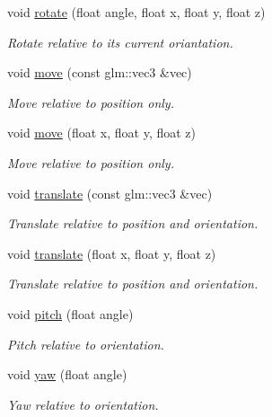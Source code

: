 \begin{DoxyCompactItemize}
void \hyperlink{classce_1_1graphics_1_1_camera_afa185e4bfffac08c2df33eed249098e1}{rotate} (float angle, float x, float y, float z)
\begin{DoxyCompactList}\small\item\em Rotate relative to its current oriantation. \end{DoxyCompactList}\item 
void \hyperlink{classce_1_1graphics_1_1_camera_a93fa78fa33b430d0bb5412624678423a}{move} (const glm\+::vec3 \&vec)
\begin{DoxyCompactList}\small\item\em Move relative to position only. \end{DoxyCompactList}\item 
void \hyperlink{classce_1_1graphics_1_1_camera_ae1f4306dcc5622eccc111c00404633df}{move} (float x, float y, float z)
\begin{DoxyCompactList}\small\item\em Move relative to position only. \end{DoxyCompactList}\item 
void \hyperlink{classce_1_1graphics_1_1_camera_a1d667c9e5b76b80713528e32a8276a18}{translate} (const glm\+::vec3 \&vec)
\begin{DoxyCompactList}\small\item\em Translate relative to position and orientation. \end{DoxyCompactList}\item 
void \hyperlink{classce_1_1graphics_1_1_camera_ae12ab3537bfcc705c212307b41d710ca}{translate} (float x, float y, float z)
\begin{DoxyCompactList}\small\item\em Translate relative to position and orientation. \end{DoxyCompactList}\item 
void \hyperlink{classce_1_1graphics_1_1_camera_a43da1012113750cc0576b235e9b26013}{pitch} (float angle)
\begin{DoxyCompactList}\small\item\em Pitch relative to orientation. \end{DoxyCompactList}\item 
void \hyperlink{classce_1_1graphics_1_1_camera_ae10a5ea5d64a90f533547f1f6e8ae7ad}{yaw} (float angle)
\begin{DoxyCompactList}\small\item\em Yaw relative to orientation. \end{DoxyCompactList}\item 

\end{DoxyCompactItemize}
